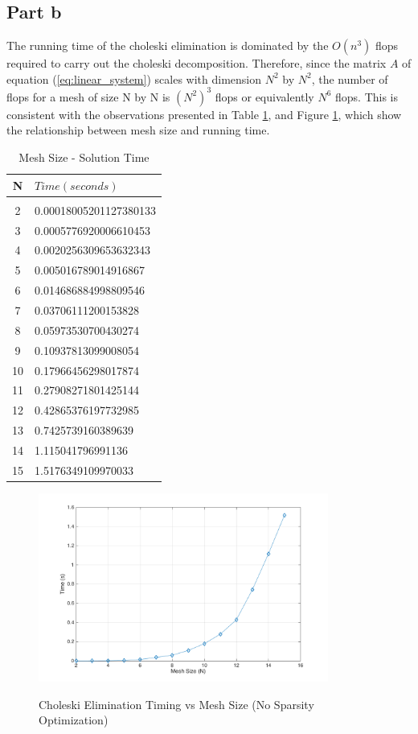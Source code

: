 \documentclass[11pt]{amsart}
\begin{document}
\subsection*{Part b} The running time of the choleski elimination is dominated by the $O(n^3)$ flops required to carry out the choleski decomposition. Therefore, since the matrix $A$ of equation (\ref{eq:linear_system}) scales with dimension $N^2$ by $N^2$, the number of flops for a mesh of size N by N is $(N^2)^3$ flops or equivalently $N^6$ flops. This is consistent with the observations presented in Table \ref{tbl:time_v_mesh}, and Figure \ref{fig:t_n_unopt}, which show the relationship between mesh size and running time.

\begin{table}[h!]
    \caption{Mesh Size - Solution Time}
    \label{tbl:time_v_mesh}
    \begin{tabular}{ c| l}
    	\textbf{N} & \textbf{$Time (seconds)$}\\ \hline \\
	2 & 0.00018005201127380133\\
	3 & 0.0005776920006610453\\
	4 & 0.0020256309653632343\\
	5 & 0.005016789014916867\\
	6 & 0.014686884998809546\\
	7 & 0.03706111200153828\\
	8 & 0.05973530700430274\\
	9 & 0.10937813099008054\\
	10 & 0.17966456298017874\\
	11 & 0.27908271801425144\\
	12 & 0.42865376197732985\\
	13 & 0.7425739160389639\\
	14 & 1.115041796991136\\
	15 & 1.5176349109970033
    \end{tabular}
\end{table}
\vspace{3em}
\begin{center}
	\begin{figure}[h]
		\caption{Choleski Elimination Timing vs Mesh Size (No Sparsity Optimization)}
		\includegraphics[width=0.85\textwidth]{assets/t_vs_n_unopt.png}\label{fig:t_n_unopt}
	\end{figure}
\end{center}
\end{document}

